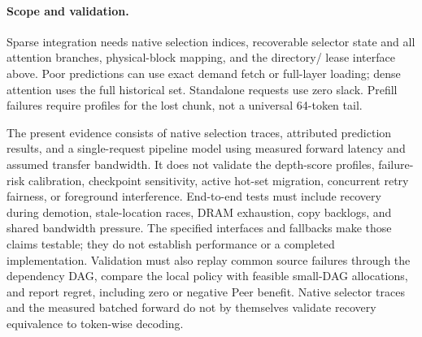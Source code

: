 \paragraph{Scope and validation.}
\label{sec:design-discussion}
Sparse integration needs native selection indices, recoverable selector
state and all attention branches, physical-block mapping, and the directory/
lease interface above. Poor predictions can use exact demand fetch or
full-layer loading; dense attention uses the full historical set.
Standalone requests use zero slack. Prefill failures require profiles for
the lost chunk, not a universal 64-token tail.

The present evidence consists of native selection traces, attributed
prediction results, and a single-request pipeline model using measured
forward latency and assumed transfer bandwidth. It does
not validate the depth-score profiles, failure-risk calibration, checkpoint
sensitivity, active hot-set migration, concurrent retry fairness, or
foreground interference. End-to-end tests must include recovery during
demotion, stale-location races, DRAM exhaustion, copy backlogs, and shared
bandwidth pressure. The specified interfaces and fallbacks make those
claims testable; they do not establish performance or a completed implementation.
Validation must also replay common source failures through the dependency
DAG, compare the local policy with feasible small-DAG allocations, and
report regret, including zero or negative Peer benefit. Native selector
traces and the measured batched forward do not by themselves validate
recovery equivalence to token-wise decoding.
